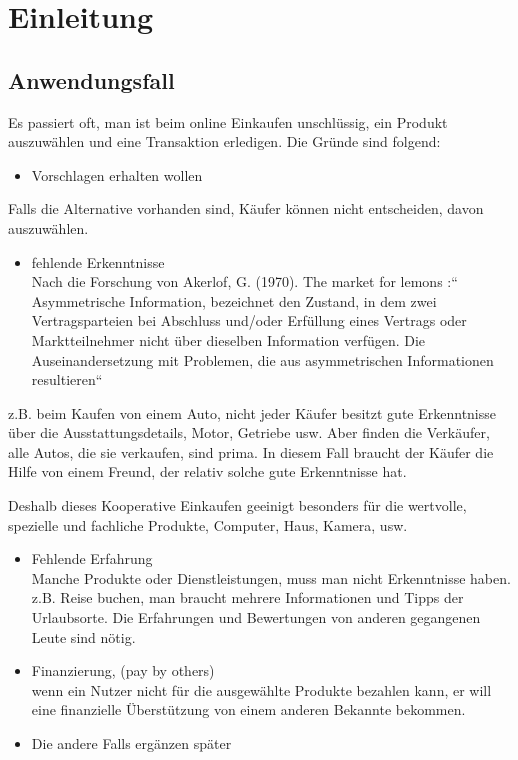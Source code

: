 
\chapter{Einleitung}


\section{Anwendungsfall}

Es passiert oft, man ist beim online Einkaufen unschlüssig, ein Produkt auszuwählen und eine Transaktion erledigen. Die Gründe sind folgend:

\begin{itemize}
\item Vorschlagen erhalten wollen
\end{itemize}

Falls die Alternative vorhanden sind, Käufer können nicht entscheiden, davon auszuwählen.

\begin{itemize}
\item fehlende Erkenntnisse\\
Nach die Forschung von Akerlof, G. (1970). The market for lemons :“ Asymmetrische Information, bezeichnet den Zustand, in dem zwei Vertragsparteien bei Abschluss und/oder Erfüllung eines Vertrags oder Marktteilnehmer nicht über dieselben Information verfügen. Die Auseinandersetzung mit Problemen, die aus asymmetrischen Informationen resultieren“
\end{itemize}

z.B. beim Kaufen von einem Auto, nicht jeder Käufer besitzt gute Erkenntnisse über die Ausstattungsdetails, Motor, Getriebe usw. Aber finden die Verkäufer, alle Autos, die sie verkaufen, sind prima. In diesem Fall braucht der Käufer die Hilfe von einem Freund, der relativ solche gute Erkenntnisse hat.

Deshalb dieses Kooperative Einkaufen geeinigt besonders für die wertvolle, spezielle und fachliche Produkte, Computer, Haus, Kamera, usw.

\begin{itemize}
\item Fehlende Erfahrung\\
Manche Produkte oder Dienstleistungen, muss man nicht Erkenntnisse haben. z.B. Reise buchen, man braucht mehrere Informationen und Tipps der Urlaubsorte. Die Erfahrungen und Bewertungen von anderen gegangenen Leute sind nötig.
\item Finanzierung, (pay by others)\\
wenn ein Nutzer nicht für die ausgewählte Produkte bezahlen kann, er will eine finanzielle Überstützung von einem anderen Bekannte bekommen.
\item Die andere Falls ergänzen später
\end{itemize}



